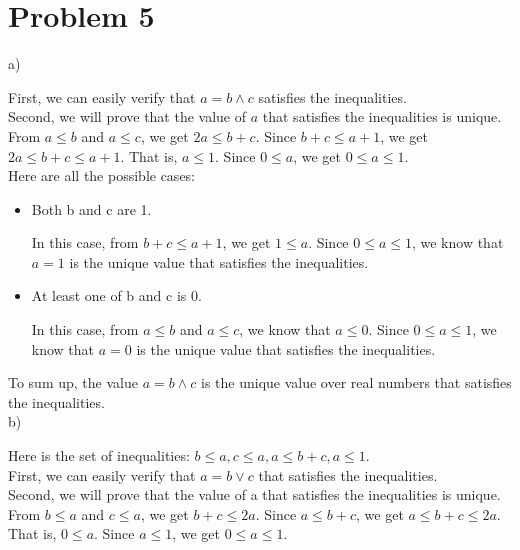 \documentclass[12pt]{article}
\begin{document}
\section*{Problem 5}

a)

First, we can easily verify that $a = b \land c$ satisfies the
inequalities. \\

Second, we will prove that the value of $a$ that satisfies the
inequalities is unique. \\

From $a \le b$ and $a \le c$, we get $2a \le b + c$. Since $b + c \le a
+ 1$, we get $2a \le b + c \le a + 1$. That is, $a \le 1$. Since $0 \le
a$, we get $0 \le a \le 1$. \\

Here are all the possible cases:

\begin{itemize}
\item Both b and c are 1.

  In this case, from $b + c \le a + 1$, we get $1 \le a$. Since $0 \le
  a \le 1$, we know that $a = 1$ is the unique value that satisfies
  the inequalities.
\item At least one of b and c is 0.

  In this case, from $a \le b$ and $a \le c$, we know that $a \le
  0$. Since $0 \le a \le 1$, we know that $a = 0$ is the unique value
  that satisfies the inequalities.
\end{itemize}

To sum up, the value $a = b \land c$ is the unique value over real
numbers that satisfies the inequalities. \\

b)

Here is the set of inequalities: $b \le a, c \le a, a \le b + c, a \le
1$. \\

First, we can easily verify that $a = b \lor c$ that satisfies the
inequalities. \\

Second, we will prove that the value of a that satisfies the
inequalities is unique. \\

From $b \le a$ and $c \le a$, we get $b + c \le 2a$. Since $a \le b +
c$, we get $a \le b + c \le 2a$. That is, $0 \le a$. Since $a \le 1$,
we get $0 \le a \le 1$. \\
\end{document}

